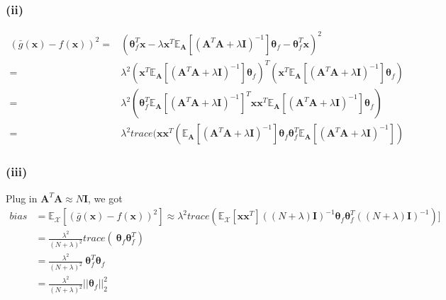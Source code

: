 \documentclass[11pt]{article}
\begin{document}
\subsubsection*{(ii)}
\begin{equation}
\begin{split}
(\bar{g}(\pmb{x})-f(\pmb{x}))^2 =& ( \pmb{\theta}_f^T\pmb{x}-\lambda\pmb{x}^T\mathbb{E}_{\pmb{A}}[(\pmb{A}^T\pmb{A}+\lambda\pmb{I})^{-1}]\pmb{\theta}_f - \pmb{\theta}_f^T\pmb{x})^2\\
=&\lambda^2(\pmb{x}^T\mathbb{E}_{\pmb{A}}[(\pmb{A}^T\pmb{A}+\lambda\pmb{I})^{-1}]\pmb{\theta}_f)^T(\pmb{x}^T\mathbb{E}_{\pmb{A}}[(\pmb{A}^T\pmb{A}+\lambda\pmb{I})^{-1}]\pmb{\theta}_f)\\
=&\lambda^2(\pmb{\theta}_f^T\mathbb{E}_{\pmb{A}}[(\pmb{A}^T\pmb{A}+\lambda\pmb{I})^{-1}]^T\pmb{x}\pmb{x}^T\mathbb{E}_{\pmb{A}}[(\pmb{A}^T\pmb{A}+\lambda\pmb{I})^{-1}]\pmb{\theta}_f)\\
=&\lambda^2 trace(\pmb{x}\pmb{x}^T(\mathbb{E}_{\pmb{A}}[(\pmb{A}^T\pmb{A}+\lambda\pmb{I})^{-1}]\pmb{\theta}_f\pmb{\theta}_f^T\mathbb{E}_{\pmb{A}}[(\pmb{A}^T\pmb{A}+\lambda\pmb{I})^{-1}])
\end{split}
\end{equation}
\subsubsection*{(iii)}
Plug in $\pmb{A}^T\pmb{A}\approx N\pmb{I}$, we got 
\begin{equation}
\begin{split}
bias &= \mathbb{E}_{\mathcal{X}}[(\bar{g}(\pmb{x})-f(\pmb{x}))^2] \approx \lambda^2 trace(\mathbb{E}_{\mathcal{X}}[\pmb{x}\pmb{x}^T]((N+\lambda)\pmb{I})^{-1}\pmb{\theta}_f\pmb{\theta}_f^T((N+\lambda)\pmb{I})^{-1})]\\
&=\frac{\lambda^2}{(N+\lambda)^2}trace(\
\pmb{\theta}_f\pmb{\theta}_f^T)\\
&=\frac{\lambda^2}{(N+\lambda)^2}\
\pmb{\theta}_f^T\pmb{\theta}_f\\
&=\frac{\lambda^2}{(N+\lambda)^2}||\pmb{\theta}_f||^2_2
\end{split}
\end{equation}
\end{document}
